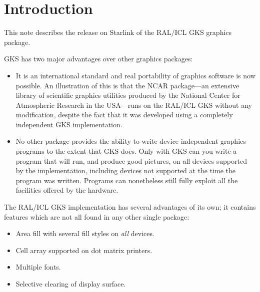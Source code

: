\documentclass[11pt]{article}
\newcommand{\stardocinitials}  {SUN}
\newcommand{\stardocnumber}    {83.13}
\newcommand{\stardocname}{\stardocinitials /\stardocnumber}
\newenvironment{latexonly}{}{}
\newcommand{\latexonlytoc}[0]{\tableofcontents}
\renewcommand{\thepage}{\roman{page}}
\begin{document}
\renewcommand{\thepage}{\arabic{page}}
\setcounter{page}{1}

\section{Introduction}
This note describes the release on Starlink of the RAL/ICL GKS graphics
package.

GKS has two major advantages over other graphics packages:
\begin{itemize}                   

\item It is an international standard and real portability of graphics software
is now possible. An illustration of this is that the NCAR
package---an extensive library of scientific graphics utilities produced by the
National Center for Atmospheric Research in the USA---runs on the RAL/ICL GKS
without any modification, despite the fact that it was developed using a
completely independent GKS implementation. 

\item No other package provides the ability to write device independent graphics
programs to the extent that GKS does.
Only with GKS can you write a program that will run, and produce good pictures,
on all devices supported by the implementation, including devices not supported
at the time the program was written.
Programs can nonetheless still fully exploit all the facilities offered by the
hardware.
\end{itemize}
The RAL/ICL GKS implementation has several advantages of its own;
it contains features which are not all found in any other single package:
\begin{itemize}
\item Area fill with several fill styles on {\em all\/} devices.
\item Cell array supported on dot matrix printers.
\item Multiple fonts.
\item Selective clearing of display surface.
\end{itemize}
\end{document}

